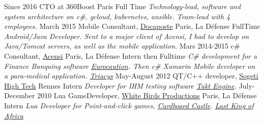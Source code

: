 \documentclass{emonides-cv}
\begin{document}
\begin{entrylist}
  \entry
    {Since  2016}
    {CTO at 360Boost {\normalfont Paris}}
    {Full Time}
    {\emph{Technology-lead, software and system architecture on c\#, gcloud, kubernetes, ansible. Team-lead with 4 employees.}}
  \entry
    {March 2015}
    {Mobile Consultant, \href{https://www.docapost.com/en/}{Docaposte} {\normalfont Paris, La Défense}}
    {FullTime}
    {\emph{Android/Java Developer. Sent to a major client of Acensi, I had to develop on Java/Tomcat servers, as well as the mobile application.}}
  \entry
    {Mars 2014-2015}
    {c\# Consultant, \href{https://www.acensi.fr/}{Acensi} {\normalfont Paris, La Défense}}
    {Intern then Fulltime}
    {\emph{C\# development for a Finance Banquing software \href{https://www.eurocaution.net/}{Eurocaution}. Then c\# Xamarin Mobile developer on a para-medical application.  \href{http://www.triacys.com/}{Triacys}}}
  \entry
    {May-August 2012}
    {QT/C++ developer, \href{https://www.acensi.fr/}{Sogeti High Tech} {\normalfont Rennes}}
    {Intern}
    {\emph{Developer for IHM testing software \href{https://www.eurocaution.net/}{Takt Engine}.}}
  \entry
    {July-December 2010}
    {Lua GameDeveloper, \href{https://www.giantbomb.com/white-birds-productions/3010-5637/}{White Birds Productions} {\normalfont Paris, La Défense}}
    {Intern}
    {\emph{Lua Developer for Point-and-click games, \href{https://www.bigfishgames.com/games/6859/cardboard-castle/}{Cardboard Castle}. \href{https://www.wikiwand.com/fr/White_Birds_Productions}{Last King of Africa}}}
\end{entrylist}
\end{document}
